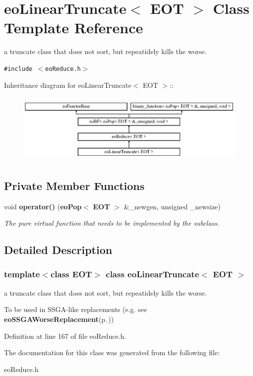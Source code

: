 \section{eo\-Linear\-Truncate$<$ EOT $>$ Class Template Reference}
\label{classeo_linear_truncate}
a truncate class that does not sort, but repeatidely kills the worse.  


{\tt \#include $<$eo\-Reduce.h$>$}

Inheritance diagram for eo\-Linear\-Truncate$<$ EOT $>$::\begin{figure}[H]
\begin{center}
\leavevmode
\includegraphics[height=3.45679cm]{classeo_linear_truncate}
\end{center}
\end{figure}
\subsection*{Private Member Functions}
\begin{CompactItemize}
\item 
void {\bf operator()} ({\bf eo\-Pop}$<$ {\bf EOT} $>$ \&\_\-newgen, unsigned \_\-newsize)\label{classeo_linear_truncate_d0}

\begin{CompactList}\small\item\em The pure virtual function that needs to be implemented by the subclass. \item\end{CompactList}\end{CompactItemize}


\subsection{Detailed Description}
\subsubsection*{template$<$class EOT$>$ class eo\-Linear\-Truncate$<$ EOT $>$}

a truncate class that does not sort, but repeatidely kills the worse. 

To be used in SSGA-like replacements (e.g. see {\bf eo\-SSGAWorse\-Replacement}{\rm (p.\,\pageref{classeo_s_s_g_a_worse_replacement})}) 



Definition at line 167 of file eo\-Reduce.h.

The documentation for this class was generated from the following file:\begin{CompactItemize}
\item 
eo\-Reduce.h\end{CompactItemize}
